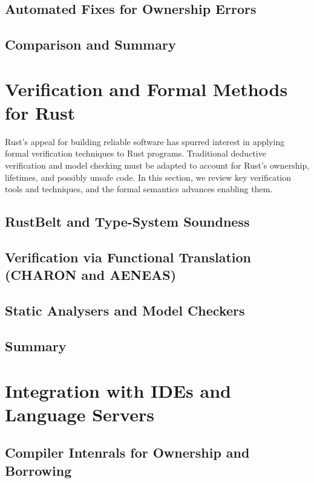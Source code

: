 \subsection{Automated Fixes for Ownership Errors}

\subsection{Comparison and Summary}

\section{Verification and Formal Methods for Rust}
\label{sec:verification_formal_methods}
Rust's appeal for building reliable software has spurred interest in applying
formal verification techniques to Rust programs. Traditional deductive
verification and model checking must be adapted to account for Rust's ownership,
lifetimes, and possibly unsafe code. In this section, we review key verification
tools and techniques, and the formal semantics advances enabling them.

\subsection{RustBelt and Type-System Soundness}

\subsection{Verification via Functional Translation (CHARON and AENEAS)}


\subsection{Static Analysers and Model Checkers}

\subsection{Summary}

\section{Integration with IDEs and Language Servers}
\label{sec:integration_language_server}

\subsection{Compiler Intenrals for Ownership and Borrowing}

